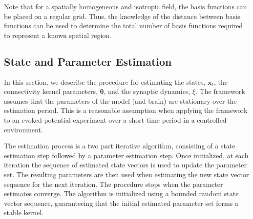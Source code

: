\documentclass[review,authoryear,3p]{elsarticle}
\begin{document}
Note that for a spatially homogeneous and isotropic field, the basis functions can be placed on a regular grid. Thus, the knowledge of the distance between basis functions can be used to determine the total number of basis functions required to represent a known spatial region.

\subsection{State and Parameter Estimation}\label{StateAndParameterEstimationSection} In this section, we describe the procedure for estimating the states, $\mathbf{x}_t$, the connectivity kernel parameters, $\boldsymbol \theta$, and the synaptic dynamics, $\xi$. The framework assumes that the parameters of the model (and brain) are stationary over the estimation period. This is a reasonable assumption when applying the framework to an evoked-potential experiment over a short time period in a controlled environment.

The estimation process is a two part iterative algorithm, consisting of a state estimation step followed by a parameter estimation step. Once initialized, at each iteration the sequence of estimated state vectors is used to update the parameter set. The resulting parameters are then used when estimating the new state vector sequence for the next iteration. The procedure stops when the parameter estimates converge. The algorithm is initialized using a bounded random state vector sequence, guaranteeing that the initial estimated parameter set forms a stable kernel.
\end{document}
